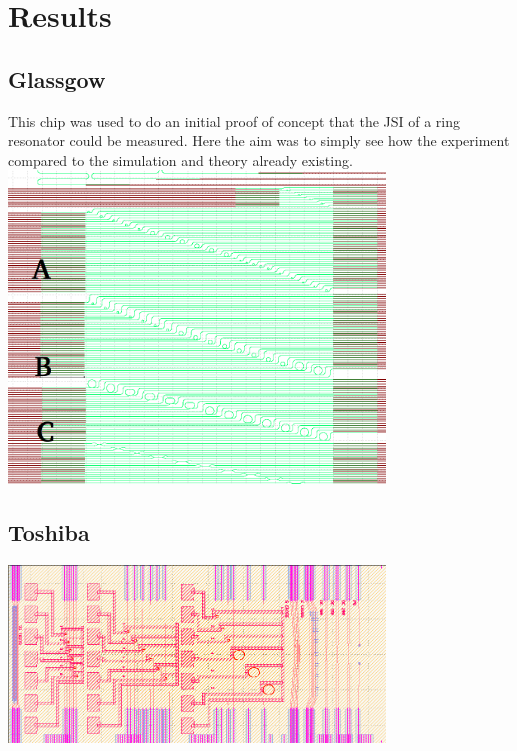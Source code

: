\newpage
\section{Results}
\subsection{Glassgow}

This chip was used to do an initial proof of concept that the JSI of a ring resonator could be measured. Here the aim was to simply see how the experiment compared to the simulation and theory already existing.
\begingroup
    \centering  
    \includegraphics[width=10cm]{img/results/glassgowChipNumbering.png}
     \vspace{3pt} \label{crossCompare}
\endgroup
\subsection{Toshiba}
\begingroup
    \centering  
    \includegraphics[width=10cm]{img/results/toshiba.png}
     \vspace{3pt} \label{crossCompare}
\endgroup
